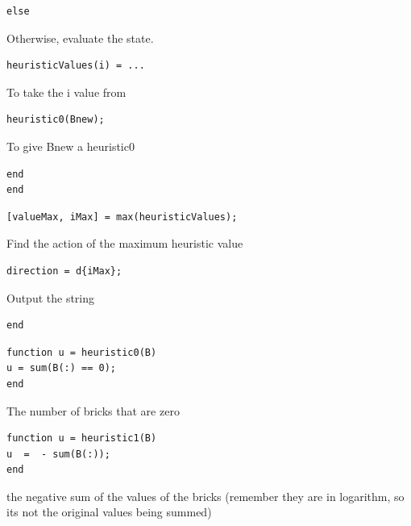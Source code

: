 \documentclass{article}
\begin{document}
\begin{tcolorbox}
\begin{verbatim}
else
\end{verbatim}
\end{tcolorbox}
Otherwise, evaluate the state.

\begin{tcolorbox}
\begin{verbatim}
heuristicValues(i) = ...
\end{verbatim}
\end{tcolorbox}
To take the i value from

\begin{tcolorbox}
\begin{verbatim}
heuristic0(Bnew);
\end{verbatim}
\end{tcolorbox}
To give Bnew a heuristic0

\begin{tcolorbox}
\begin{verbatim}
end
end
\end{verbatim}
\end{tcolorbox}

\begin{tcolorbox}
\begin{verbatim}
[valueMax, iMax] = max(heuristicValues);
\end{verbatim}
\end{tcolorbox}
Find the action of the maximum heuristic value

\begin{tcolorbox}
\begin{verbatim}
direction = d{iMax};
\end{verbatim}
\end{tcolorbox}
Output the string

\begin{tcolorbox}
\begin{verbatim}
end
\end{verbatim}
\end{tcolorbox}

\begin{tcolorbox}
\begin{verbatim}
function u = heuristic0(B)
u = sum(B(:) == 0);
end
\end{verbatim}
\end{tcolorbox}
The number of bricks that are zero

\begin{tcolorbox}
\begin{verbatim}
function u = heuristic1(B)
u  =  - sum(B(:)); 
end
\end{verbatim}
\end{tcolorbox}
the negative sum of the values of the bricks (remember they are in logarithm, so its not the original values being summed)
\end{document}
